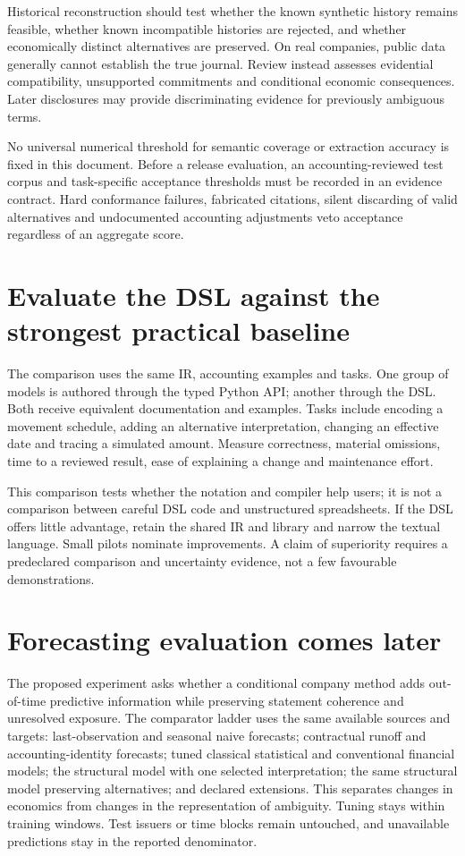 Historical reconstruction should test whether the known synthetic history
remains feasible, whether known incompatible histories are rejected, and
whether economically distinct alternatives are preserved. On real companies,
public data generally cannot establish the true journal. Review instead
assesses evidential compatibility, unsupported commitments and conditional
economic consequences. Later disclosures may provide discriminating evidence
for previously ambiguous terms.

No universal numerical threshold for semantic coverage or extraction accuracy
is fixed in this document. Before a release evaluation, an accounting-reviewed
test corpus and task-specific acceptance thresholds must be recorded in an
evidence contract. Hard conformance failures, fabricated citations, silent
discarding of valid alternatives and undocumented accounting adjustments veto
acceptance regardless of an aggregate score.

\section{Evaluate the DSL against the strongest practical baseline}

The comparison uses the same IR, accounting examples and tasks. One group of
models is authored through the typed Python API; another through the DSL.
Both receive equivalent documentation and examples. Tasks include encoding a
movement schedule, adding an alternative interpretation, changing an effective
date and tracing a simulated amount. Measure correctness, material omissions,
time to a reviewed result, ease of explaining a change and maintenance effort.

This comparison tests whether the notation and compiler help users; it is not
a comparison between careful DSL code and unstructured spreadsheets. If the
DSL offers little advantage, retain the shared IR and library and narrow the
textual language. Small pilots nominate improvements. A claim of superiority
requires a predeclared comparison and uncertainty evidence, not a few favourable
demonstrations.

\section{Forecasting evaluation comes later}

The proposed experiment asks whether a conditional company method adds
out-of-time predictive information while preserving statement coherence and
unresolved exposure. The comparator ladder uses the same available sources and
targets: last-observation and seasonal naive forecasts; contractual runoff and
accounting-identity forecasts; tuned classical statistical and conventional
financial models; the structural model with one selected interpretation;
the same structural model preserving alternatives; and declared extensions.
This separates changes in economics from changes in the representation of
ambiguity. Tuning stays within training
windows. Test issuers or time blocks remain untouched, and unavailable
predictions stay in the reported denominator.

